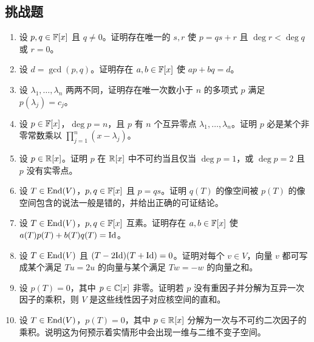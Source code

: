 \subsection*{挑战题}
\begin{enumerate}[resume, label=\textbf{\arabic*.}, leftmargin=*, itemsep=0.5em]
\item \hard 设 $p,q\in\mathbb{F}[x]$ 且 $q\neq 0$。证明存在唯一的 $s,r$ 使 $p=qs+r$ 且 $\deg r<\deg q$ 或 $r=0$。
\item \hard 设 $d=\gcd(p,q)$。证明存在 $a,b\in\mathbb{F}[x]$ 使 $ap+bq=d$。
\item \hard 设 $\lambda_1,\dots,\lambda_n$ 两两不同，证明存在唯一次数小于 $n$ 的多项式 $p$ 满足 $p(\lambda_j)=c_j$。
\item \hard 设 $p\in\mathbb{F}[x]$，$\deg p=n$，且 $p$ 有 $n$ 个互异零点 $\lambda_1,\dots,\lambda_n$。证明 $p$ 必是某个非零常数乘以 $\prod_{j=1}^n(x-\lambda_j)$。
\item \hard 设 $p\in\mathbb{R}[x]$。证明 $p$ 在 $\mathbb{R}[x]$ 中不可约当且仅当 $\deg p=1$，或 $\deg p=2$ 且 $p$ 没有实零点。
\item \hard 设 $T\in\mathrm{End}(V)$，$p,q\in\mathbb{F}[x]$ 且 $p=q s$。证明 $q(T)$ 的像空间被 $p(T)$ 的像空间包含的说法一般是错的，并给出正确的可证结论。
\item \hard 设 $T\in\mathrm{End}(V)$，$p,q\in\mathbb{F}[x]$ 互素。证明存在 $a,b\in\mathbb{F}[x]$ 使 $a(T)p(T)+b(T)q(T)=\mathrm{Id}$。
\item \hard 设 $T\in\mathrm{End}(V)$ 且 $(T-2\mathrm{Id})(T+\mathrm{Id})=0$。证明对每个 $v\in V$，向量 $v$ 都可写成某个满足 $Tu=2u$ 的向量与某个满足 $Tw=-w$ 的向量之和。
\item \hard 设 $p(T)=0$，其中 $p\in\mathbb{C}[x]$ 非零。证明若 $p$ 没有重因子并分解为互异一次因子的乘积，则
$V$ 是这些线性因子对应核空间的直和。
\item \hard 设 $T\in\mathrm{End}(V)$，$p(T)=0$，其中 $p\in\mathbb{R}[x]$ 分解为一次与不可约二次因子的乘积。说明这为何预示着实情形中会出现一维与二维不变子空间。
\end{enumerate}

